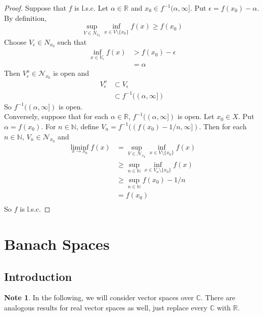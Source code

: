 \documentclass[12pt]{amsart}
\theoremstyle{definition}
\newtheorem{note}[definition]{Note}
\newcommand{\al}{\alpha}
\newcommand{\ep}{\epsilon}
\newcommand{\C}{\mathbb{C}}
\newcommand{\N}{\mathbb{N}}
\newcommand{\R}{\mathbb{R}}
\newcommand{\MN}{\mathcal{N}}
\newcommand{\lsc}{l.s.c. }
\begin{document}
	\begin{proof}
	Suppose that $f$ is \lsc Let $\al \in \R$ and $x_0 \in f^{-1}(\al, \infty]$. Put $\ep = f(x_0) - \al$. By definition, $$\sup_{V \in N_{x_0}} \inf_{x \in V \setminus \{x_0\}} f(x) \geq f(x_0)$$ Choose $V_{\ep} \in N_{x_0}$ such that 
	\begin{align*}
	\inf_{x \in V_{\ep}} f(x)  
	&> f(x_0) - \ep \\
	&= \al
\end{align*}
Then $V_{\ep}^o \in \MN_{x_0}$ is open and 
	\begin{align*}
		V_{\ep}^o 
		& \subset V_{\ep} \\
		&\subset f^{-1}((\al, \infty])
	\end{align*} 
	So $f^{-1}((\al, \infty])$ is open. \\
	Conversely, suppose that for each $\al \in \R$, $f^{-1}((\al, \infty])$ is open. Let $x_0 \in X$. Put $\al = f(x_0)$. For $n \in \N$, define $V_n = f^{-1}((f(x_0)-1/n, \infty]) $. Then for each $n \in \N$, $V_n \in \MN_{x_0}$ and 
	\begin{align*}
	\liminf_{x \rightarrow x_0} f(x) 
	&= \sup_{V \in \MN_{x_0}} \inf_{x \in V \setminus \{x_0\}} f(x) \\
	& \geq \sup_{n \in \N} \inf_{x \in V_n \setminus \{x_0\}} f(x) \\
	& \geq \sup_{n \in \N} f(x_0)-1/n \\
	&= f(x_0) \\
	\end{align*}
	So $f$ is \lsc
	\end{proof}
	
	
	
	
	
	
	
	
	
	
	
	
	
	
	
	
	\newpage
	\section{Banach Spaces}
	\subsection{Introduction}
	\begin{note}
		In the following, we will consider vector spaces over $\C$. There are analogous results for real vector spaces as well, just replace every $\C$ with $\R$.
	\end{note}
	
\end{document}
